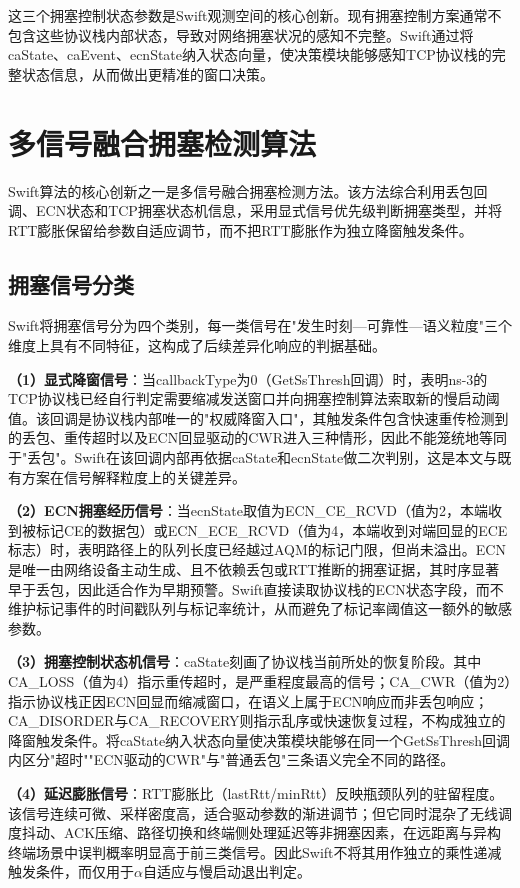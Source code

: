 这三个拥塞控制状态参数是Swift观测空间的核心创新。现有拥塞控制方案通常不包含这些协议栈内部状态，导致对网络拥塞状况的感知不完整。Swift通过将caState、caEvent、ecnState纳入状态向量，使决策模块能够感知TCP协议栈的完整状态信息，从而做出更精准的窗口决策。

\section{多信号融合拥塞检测算法}\label{sec:multi-signal}

Swift算法的核心创新之一是多信号融合拥塞检测方法。该方法综合利用丢包回调、ECN状态和TCP拥塞状态机信息，采用显式信号优先级判断拥塞类型，并将RTT膨胀保留给参数自适应调节，而不把RTT膨胀作为独立降窗触发条件。

\subsection{拥塞信号分类}

Swift将拥塞信号分为四个类别，每一类信号在"发生时刻—可靠性—语义粒度"三个维度上具有不同特征，这构成了后续差异化响应的判据基础。

\textbf{（1）显式降窗信号}：当callbackType为0（GetSsThresh回调）时，表明ns-3的TCP协议栈已经自行判定需要缩减发送窗口并向拥塞控制算法索取新的慢启动阈值。该回调是协议栈内部唯一的"权威降窗入口"，其触发条件包含快速重传检测到的丢包、重传超时以及ECN回显驱动的CWR进入三种情形，因此不能笼统地等同于"丢包"。Swift在该回调内部再依据caState和ecnState做二次判别，这是本文与既有方案在信号解释粒度上的关键差异。

\textbf{（2）ECN拥塞经历信号}：当ecnState取值为ECN\_CE\_RCVD（值为2，本端收到被标记CE的数据包）或ECN\_ECE\_RCVD（值为4，本端收到对端回显的ECE标志）时，表明路径上的队列长度已经越过AQM的标记门限，但尚未溢出。ECN是唯一由网络设备主动生成、且不依赖丢包或RTT推断的拥塞证据，其时序显著早于丢包，因此适合作为早期预警。Swift直接读取协议栈的ECN状态字段，而不维护标记事件的时间戳队列与标记率统计，从而避免了标记率阈值这一额外的敏感参数。

\textbf{（3）拥塞控制状态机信号}：caState刻画了协议栈当前所处的恢复阶段。其中CA\_LOSS（值为4）指示重传超时，是严重程度最高的信号；CA\_CWR（值为2）指示协议栈正因ECN回显而缩减窗口，在语义上属于ECN响应而非丢包响应；CA\_DISORDER与CA\_RECOVERY则指示乱序或快速恢复过程，不构成独立的降窗触发条件。将caState纳入状态向量使决策模块能够在同一个GetSsThresh回调内区分"超时""ECN驱动的CWR"与"普通丢包"三条语义完全不同的路径。

\textbf{（4）延迟膨胀信号}：RTT膨胀比（lastRtt/minRtt）反映瓶颈队列的驻留程度。该信号连续可微、采样密度高，适合驱动参数的渐进调节；但它同时混杂了无线调度抖动、ACK压缩、路径切换和终端侧处理延迟等非拥塞因素，在远距离与异构终端场景中误判概率明显高于前三类信号。因此Swift不将其用作独立的乘性递减触发条件，而仅用于$\alpha$自适应与慢启动退出判定。

